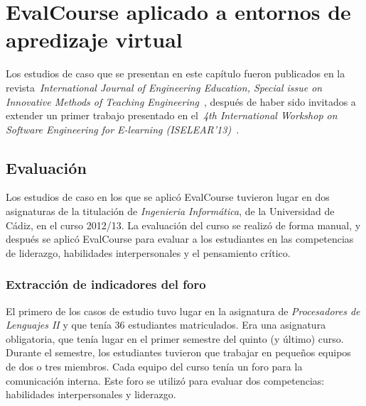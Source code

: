 

\section{EvalCourse aplicado a entornos de apredizaje virtual}

Los estudios de caso que se presentan en este capítulo fueron publicados en la revista~\emph{International Journal of Engineering Education, Special issue on Innovative Methods of Teaching Engineering}~\cite{Balderas:2015}, después de haber sido invitados a extender un primer trabajo presentado en el~\emph{4th International Workshop on Software Engineering for E-learning (ISELEAR’13)}~\cite{balderas2013generative}.

\subsection{Evaluación}

Los estudios de caso en los que se aplicó EvalCourse tuvieron lugar en dos asignaturas de la titulación de \emph{Ingenieria Informática}, de la Universidad de Cádiz, en el curso 2012/13. La evaluación del curso se realizó de forma manual, y después se aplicó EvalCourse para evaluar a los estudiantes en las competencias de liderazgo, habilidades interpersonales y el pensamiento crítico.

\subsubsection{Extracción de indicadores del foro}

El primero de los casos de estudio tuvo lugar en la asignatura de \emph{Procesadores de Lenguajes II} y que tenía 36 estudiantes matriculados. Era una asignatura obligatoria, que tenía lugar en el primer semestre del quinto (y último) curso. Durante el semestre, los estudiantes tuvieron que trabajar en pequeños equipos de dos o tres miembros. Cada equipo del curso tenía un foro para la comunicación interna. Este foro se utilizó para evaluar dos competencias: habilidades interpersonales y liderazgo.

